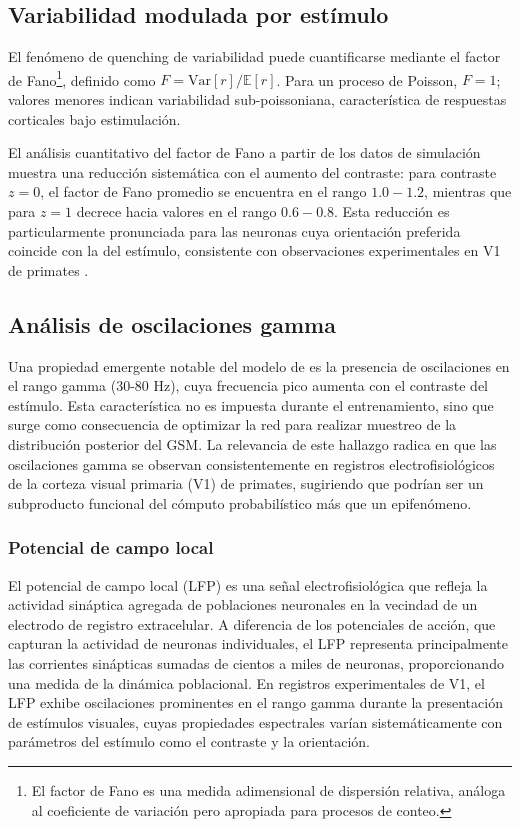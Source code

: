 \subsection{Variabilidad modulada por estímulo}
\label{subsec:res_fano}

El fenómeno de quenching de variabilidad puede cuantificarse mediante el factor de Fano\footnote{El factor de Fano es una medida 
adimensional de dispersión relativa, análoga al coeficiente de variación pero apropiada para 
procesos de conteo.}, definido como $F = \text{Var}[r] / \mathbb{E}[r]$. Para un proceso de Poisson, $F = 1$; valores menores indican variabilidad sub-poissoniana, característica de respuestas corticales bajo estimulación.

El análisis cuantitativo del factor de Fano a partir de los datos de simulación muestra una reducción sistemática con el aumento del contraste: para contraste $z = 0$, el factor de Fano promedio se encuentra en el rango $1.0 - 1.2$, mientras que para $z = 1$ decrece hacia valores en el rango $0.6 - 0.8$. Esta reducción es particularmente pronunciada para las neuronas cuya orientación preferida coincide con la del estímulo, consistente con observaciones experimentales en \acrshort{V1} de primates \citep{echeveste2020cortical}.

\subsection{Análisis de oscilaciones gamma}
  \label{subsec:res_gamma}
  Una propiedad emergente notable del modelo de \citet{echeveste2020cortical} es la presencia de
  oscilaciones en el rango gamma (30-80 Hz), cuya frecuencia pico aumenta con el contraste del
  estímulo. Esta característica no es impuesta durante el entrenamiento, sino que surge como
  consecuencia de optimizar la red para realizar muestreo de la distribución posterior del
  \acrshort{GSM}. La relevancia de este hallazgo radica en que las oscilaciones gamma se observan
  consistentemente en registros electrofisiológicos de la corteza visual primaria (\acrshort{V1}) de
  primates, sugiriendo que podrían ser un subproducto funcional del cómputo probabilístico más que un
  epifenómeno.

  \subsubsection{Potencial de campo local}
  El potencial de campo local (\acrshort{LFP}) es una señal electrofisiológica que refleja la 
  actividad sináptica agregada de poblaciones neuronales en la vecindad de un electrodo de registro 
  extracelular. A diferencia de los potenciales de acción, que capturan la actividad de neuronas 
  individuales, el \acrshort{LFP} representa principalmente las corrientes sinápticas sumadas de 
  cientos a miles de neuronas, proporcionando una medida de la dinámica poblacional. En registros 
  experimentales de \acrshort{V1}, el \acrshort{LFP} exhibe oscilaciones prominentes en el rango 
  gamma durante la presentación de estímulos visuales, cuyas propiedades espectrales varían 
  sistemáticamente con parámetros del estímulo como el contraste y la orientación.

